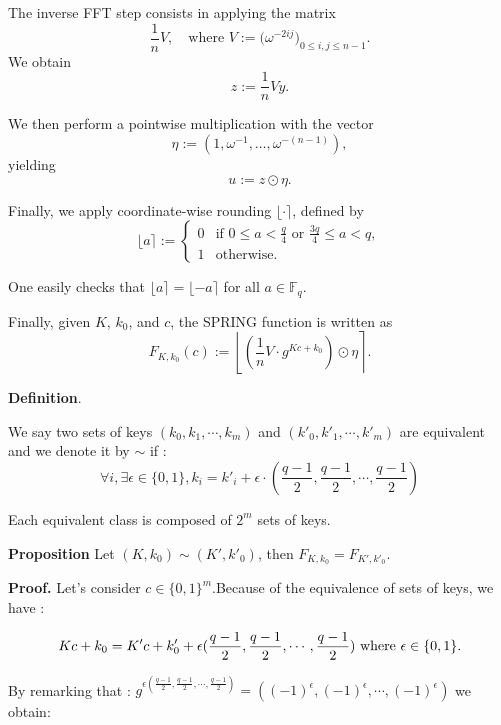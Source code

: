 \documentclass{article}
\begin{document}
The inverse FFT step consists in applying the matrix
\[
\frac{1}{n}V, \quad \text{where } V := \bigl(\omega^{-2ij}\bigr)_{0 \leq i,j \leq n-1}.
\]
We obtain
\[
z := \frac{1}{n} V y.
\]

We then perform a pointwise multiplication with the vector
\[
\eta := (1, \omega^{-1}, \dots, \omega^{-(n-1)}),
\]
yielding
\[
u := z \odot \eta.
\]

Finally, we apply coordinate-wise rounding \(\lfloor \cdot \rceil\), defined by
\[
\lfloor a \rceil :=
\begin{cases}
0 & \text{if } 0 \leq a < \frac{q}{4} \text{ or } \frac{3q}{4} \leq a < q, \\
1 & \text{otherwise}.
\end{cases}
\]

One easily checks that \(\lfloor a \rceil = \lfloor -a \rceil\) for all \(a \in \mathbb{F}_q\).

Finally, given \(K\), \(k_0\), and \(c\), the SPRING function is written as
\[
F_{K,k_0}(c)
:=
\left\lfloor
\left(
\frac{1}{n} V \cdot g^{Kc + k_0}
\right)
\odot \eta
\right\rceil.
\]

\vspace{0.3cm}

\textbf{Definition}.

We say two sets of keys $(k_0,k_1,\cdots,k_m)$ and $(k'_0,k'_1,\cdots,k'_m)$ are equivalent and we denote it by $\sim$ if :
\[
\forall i, \exists \epsilon \in \{ 0, 1\} , k_i = k'_i + \epsilon \cdot (\frac{q-1}{2}, \frac{q-1}{2}, \cdots, \frac{q-1}{2}) 
\]

Each equivalent class is composed of $2^m$ sets of keys.

\vspace{0.3cm}

\textbf{Proposition}
Let $(K,k_0) \sim (K',k'_0)$, then $F_{K,k_0} = F_{K',k'_0}$.

\vspace{0.3cm}
\textbf{Proof.}
Let's consider $c\in \{0,1\}^m$.Because of the equivalence of sets of keys, we have :

\[
Kc + k_0 = K'c + k'_0 + \epsilon (\frac{q-1}{2}, \frac{q-1}{2}, \cdots, \frac{q-1}{2}) $ where $\epsilon \in \{ 0, 1\}.
\]

\vspace{0.3cm}

By remarking that : $g^{\epsilon (\frac{q-1}{2}, \frac{q-1}{2}, \cdots, \frac{q-1}{2})} = ((-1)^\epsilon,(-1)^\epsilon,\cdots,(-1)^\epsilon) $ we obtain:
\end{document}
